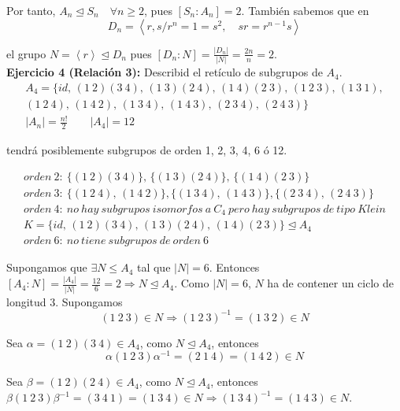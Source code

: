 \documentclass{article}
\begin{document}
Por tanto, $A_n\unlhd S_n\quad \forall n \geq 2$, pues $\left[S_n:A_n\right]=2$. También sabemos que en 
\begin{equation*}
D_n=\left\langle r,s/r^n=1=s^2,\quad sr=r^{n-1}s\right\rangle
\end{equation*}

el grupo $N=\left\langle r\right\rangle \unlhd D_n$ pues $\left[D_n:N\right]=\frac{|D_n|}{|N|}=\frac{2n}{n}=2$. \\

\textbf{Ejercicio 4 (Relación 3):} Describid el retículo de subgrupos de $A_4$.
\begin{gather*}
A_4=\{id,\,(1\:2)(3\:4),\,(1\:3)(2\:4),\,(1\:4)(2\:3),\,(1\:2\:3),\,(1\:3\:1), \\
(1\:2\:4),\,(1\:4\:2),\,(1\:3\:4),\,(1\:4\:3),\,(2\:3\:4),\,(2\:4\:3)\} \\
|A_n|=\frac{n!}{2} \qquad |A_4|=12
\end{gather*}

tendrá posiblemente subgrupos de orden 1, 2, 3, 4, 6 ó 12.

\begin{gather*}
orden\:2:\:\{(1\:2)(3\:4)\},\,\{(1\:3)(2\:4)\},\,\{(1\:4)(2\:3)\} \\
orden\:3:\:\{(1\:2\:4),\,(1\:4\:2)\},\{(1\:3\:4),\,(1\:4\:3)\},\{(2\:3\:4),\,(2\:4\:3)\} \\
orden\:4:\:no\:hay\:subgrupos\:isomorfos\:a\:C_4\:pero\:hay\:subgrupos\:de\:tipo\:Klein \\
K=\{id,\,(1\:2)(3\:4),\,(1\:3)(2\:4),\,(1\:4)(2\:3)\}\unlhd A_4 \\
orden\:6:\:no\:tiene\:subgrupos\:de\:orden\:6
\end{gather*}

Supongamos que $\exists N\leq A_4$ tal que $|N|=6$. Entonces $\left[A_4:N\right]=\frac{|A_4|}{|N|}=\frac{12}{6}=2\Rightarrow N\unlhd A_4$. Como $|N|=6$, $N$ ha de contener un ciclo de longitud $3$. Supongamos 
\begin{equation*}
(1\:2\:3)\in N\Rightarrow (1\:2\:3)^{-1}=(1\:3\:2)\in N
\end{equation*}

Sea $\alpha=(1\:2)(3\:4)\in A_4$, como $N\unlhd A_4$, entonces 
\begin{equation*}
\alpha(1\:2\:3)\alpha^{-1}=(2\:1\:4)=(1\:4\:2)\in N
\end{equation*}

Sea $\beta=(1\:2)(2\:4)\in A_4$, como $N\unlhd A_4$, entonces $\beta(1\:2\:3)\beta^{-1}=(3\:4\:1)=(1\:3\:4)\in N\Rightarrow(1\:3\:4)^{-1}=(1\:4\:3)\in N$.
\end{document}
